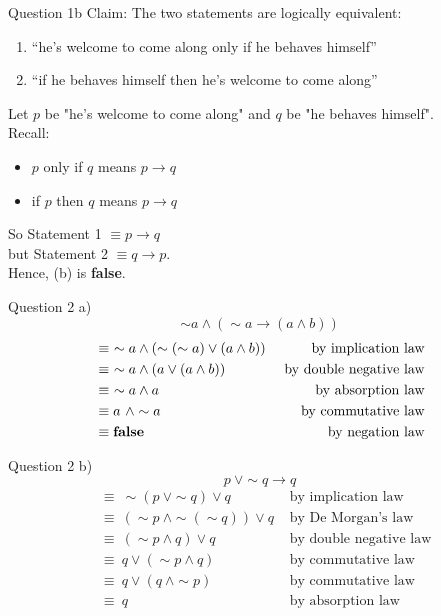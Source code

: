 \documentclass[10pt]{beamer}
\begin{document}
\begin{frame}[fragile]{Question 1b}
    Claim: The two statements are logically equivalent:
    \begin{enumerate}
        \item “he’s welcome to come along only if he behaves himself”
        \item “if he behaves himself then he’s welcome to come along”
    \end{enumerate}
    Let $p$ be "he's welcome to come along" and $q$ be "he behaves himself". \\
    Recall:
    \begin{itemize}
        \item $p$ only if $q$ means $p \rightarrow q$
        \item if $p$ then $q$ means $p \rightarrow q$
    \end{itemize}
    So Statement 1 $\equiv p \rightarrow q$ \\
    but Statement 2 $\equiv q \rightarrow p$. \\
    Hence, (b) is \textbf{false}.
\end{frame}

\begin{frame}[fragile]{Question 2}
a) $$\sim a \land ( \sim a \rightarrow (a \land b))$$
    \begin{align*}
        &\equiv \ \sim a \land ( \sim (\sim a) \lor (a \land b)) &\text{ by implication law} \\
        &\equiv \ \sim a \land ( a \lor (a \land b)) &\text{ by double negative law} \\
        &\equiv \ \sim a \land a &\text{ by absorption law} \\
        &\equiv a \ \land \sim a &\text{ by commutative law} \\
        &\equiv \text{\textbf{false}} &\text{ by negation law} 
    \end{align*}
\end{frame}

\begin{frame}[fragile]{Question 2}
b)
\[p \ \lor \sim q \rightarrow q \]
    \begin{align*}
        &\equiv \ \sim (p \ \lor \sim q) \lor q &\text{ by implication law} \\
        &\equiv \ (\sim p \ \land \sim (\sim q)) \lor q &\text{ by De Morgan's law} \\
        &\equiv \ (\sim p \land q) \lor q &\text{ by double negative law} \\
        &\equiv \ q \lor (\sim p \land q) &\text{ by commutative law} \\
        &\equiv \ q \lor (q \ \land \sim p) &\text{ by commutative law} \\
        &\equiv \ q &\text{ by absorption law}
    \end{align*}
\end{frame}
\end{document}
